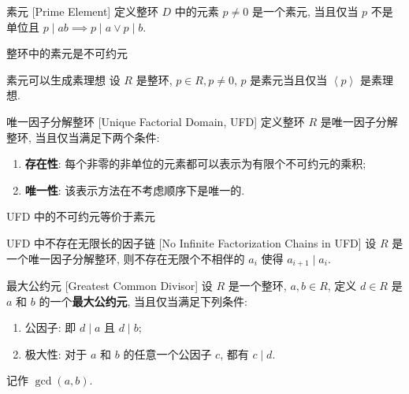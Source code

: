         \begin{dfn}
            {素元}
            [Prime Element]
            定义整环 \(D\) 中的元素 \(p\neq 0\) 是一个素元, 当且仅当 \(p\) 不是单位且 \(p\mid ab\implies p\mid a\lor p\mid b\).
        \end{dfn}

        \begin{ppt}
            {整环中的素元是不可约元}
        \end{ppt}

        \begin{ppt}
            {素元可以生成素理想}
            设 \(R\) 是整环, \(p\in R, p\neq 0\), \(p\) 是素元当且仅当 \(\left\langle p\right\rangle \) 是素理想.
        \end{ppt}

        \begin{dfn}
            {唯一因子分解整环}
            [Unique Factorial Domain, UFD]
            定义整环 \(R\) 是唯一因子分解整环, 当且仅当满足下两个条件:
            \begin{enumerate}
                \item \textbf{存在性}: 每个非零的非单位的元素都可以表示为有限个不可约元的乘积;
                \item \textbf{唯一性}: 该表示方法在不考虑顺序下是唯一的.
            \end{enumerate}
        \end{dfn}

        \begin{ppt}
            {UFD 中的不可约元等价于素元}
        \end{ppt}

        \begin{thm}
            {UFD 中不存在无限长的因子链}
            [No Infinite Factorization Chains in UFD]
            设 \(R\) 是一个唯一因子分解整环, 则不存在无限个不相伴的 \(a_i\) 使得 \(a_{i+1}\mid a_i\).
        \end{thm}

        \begin{dfn}
            [GCD]
            {最大公约元}
            [Greatest Common Divisor]
            设 \(R\) 是一个整环, \(a,b\in R\), 定义 \(d\in R\) 是 \(a\) 和 \(b\) 的一个\textbf{最大公约元}, 当且仅当满足下列条件:
            \begin{enumerate}
                \item 公因子: 即 \(d\mid a\) 且 \(d\mid b\);
                \item 极大性: 对于 \(a\) 和 \(b\) 的任意一个公因子 \(c\), 都有 \(c\mid d\).
            \end{enumerate}
            记作 \(\gcd(a,b)\).
        \end{dfn}


